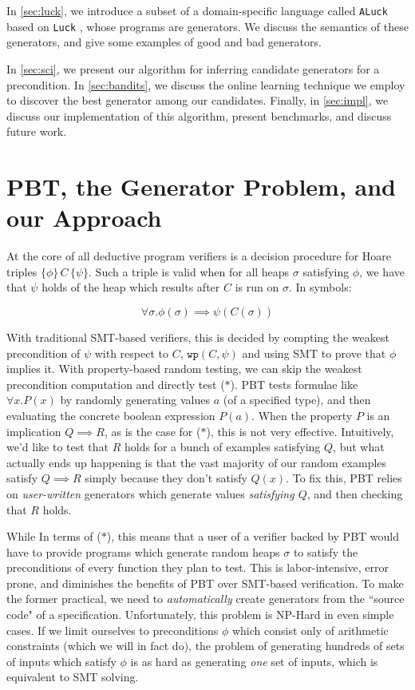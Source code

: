 \documentclass[sigconf,nonacm]{acmart}
\begin{document}
In \autoref{sec:luck}, we introduce a subset of a domain-specific language
called \texttt{ALuck} based on \texttt{Luck} \cite{luck}, whose programs are
generators. We discuss the semantics of these generators, and give some examples
of good and bad generators.

In \autoref{sec:sci}, we present our algorithm for inferring candidate
generators for a precondition. In \autoref{sec:bandits}, we discuss the online
learning technique we employ to discover the best generator among our
candidates. Finally, in \autoref{sec:impl}, we discuss our implementation of
this algorithm, present benchmarks, and discuss future work.

\section{PBT, the Generator Problem, and our Approach}
\label{sec:pbt}
At the core of all deductive program verifiers is a decision procedure for Hoare
triples $\{\phi\}\, C \, \{\psi\}$. Such a triple is valid when for all heaps
$\sigma$ satisfying $\phi$, we have that $\psi$ holds of the heap which results
after $C$ is run on $\sigma$. In symbols:

\[
\forall \sigma. \phi(\sigma) \implies \psi(C(\sigma)) \tag{$\ast$}
\]

With traditional SMT-based verifiers, this is decided by compting the weakest
precondition of $\psi$ with respect to $C$, $\texttt{wp}(C,\psi)$ and using SMT
to prove that $\phi$ implies it. With property-based random testing, we can skip
the weakest precondition computation and directly test ($\ast$). PBT tests
formulae like $\forall x. P(x)$ by randomly generating values $a$ (of a
specified type), and then evaluating the concrete boolean expression $P(a)$.
When the property $P$ is an implication $Q \implies R$, as is the case for
($\ast$), this is not very effective. Intuitively, we'd like to test that $R$
holds for a bunch of examples satisfying $Q$, but what actually ends up
happening is that the vast majority of our random examples satisfy $Q \implies
R$ simply because they don't satisfy $Q(x)$. To fix this, PBT relies on
\textit{user-written} generators which generate values \textit{satisfying $Q$},
and then checking that $R$ holds.

While 
In terms of ($\ast$), this means that a user of a verifier backed by PBT would
have to provide programs which generate random heaps $\sigma$ to satisfy the
preconditions of every function they plan to test. This is labor-intensive,
error prone, and diminishes the benefits of PBT over SMT-based verification. To
make the former practical, we need to \textit{automatically} create generators
from the ``source code" of a specification. Unfortunately, this problem is
NP-Hard in even simple cases. If we limit ourselves to preconditions $\phi$
which consist only of arithmetic constraints (which we will in fact do), the
problem of generating hundreds of sets of inputs which satisfy $\phi$ is as hard
as generating \textit{one} set of inputs, which is equivalent to SMT solving.
\end{document}
